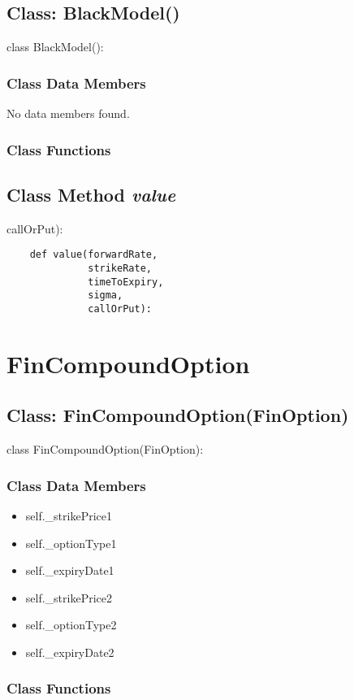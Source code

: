 \documentclass[twoside,11pt]{book}
\begin{document}
\subsection{Class: BlackModel()}
class BlackModel():

\subsubsection{Class Data Members}
No data members found.

\subsubsection{Class Functions}

\subsection{Class Method {\it value}}
callOrPut):

\begin{lstlisting}
    def value(forwardRate,
              strikeRate,
              timeToExpiry,
              sigma,
              callOrPut):
\end{lstlisting}

\newpage
\section{FinCompoundOption}

\subsection{Class: FinCompoundOption(FinOption)}
class FinCompoundOption(FinOption):

\subsubsection{Class Data Members}
\begin{itemize}
\item{self.\_strikePrice1}
\item{self.\_optionType1}
\item{self.\_expiryDate1}
\item{self.\_strikePrice2}
\item{self.\_optionType2}
\item{self.\_expiryDate2}
\end{itemize}

\subsubsection{Class Functions}
\end{document}
